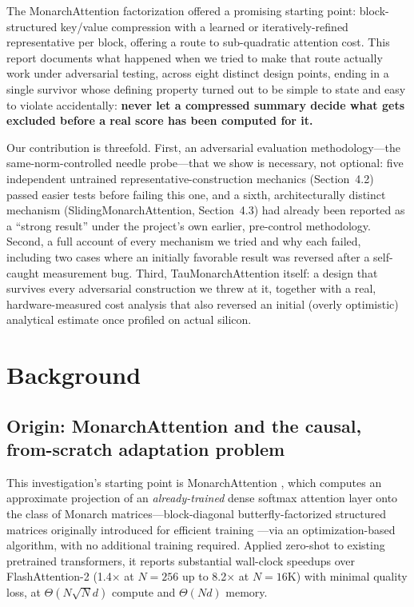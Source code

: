 \documentclass[11pt]{article}
\begin{document}
The MonarchAttention factorization offered a promising starting point: block-structured
key/value compression with a learned or iteratively-refined representative per block,
offering a route to sub-quadratic attention cost. This report documents what happened when
we tried to make that route actually work under adversarial testing, across eight
distinct design points, ending in a single survivor whose defining property turned out to
be simple to state and easy to violate accidentally: \textbf{never let a compressed summary
decide what gets excluded before a real score has been computed for it.}

Our contribution is threefold. First, an adversarial evaluation methodology---the
same-norm-controlled needle probe---that we show is necessary, not optional: five
independent untrained representative-construction mechanics (Section~4.2) passed
easier tests before failing this one, and a sixth, architecturally distinct mechanism
(SlidingMonarchAttention, Section~4.3) had already been reported as a ``strong result''
under the project's own earlier, pre-control methodology. Second, a full account of every
mechanism we tried and why each failed, including two cases where an initially favorable
result was reversed after a self-caught measurement bug. Third, TauMonarchAttention
itself: a design that survives every adversarial construction we threw at it, together
with a real, hardware-measured cost analysis that also reversed an initial (overly
optimistic) analytical estimate once profiled on actual silicon.

\section{Background}

\subsection{Origin: MonarchAttention and the causal, from-scratch adaptation problem}

This investigation's starting point is MonarchAttention \cite{monarchattn}, which computes
an approximate projection of an \emph{already-trained} dense softmax attention layer onto
the class of Monarch matrices---block-diagonal butterfly-factorized structured matrices
originally introduced for efficient training \cite{monarch}---via an optimization-based
algorithm, with no additional training required. Applied zero-shot to existing pretrained
transformers, it reports substantial wall-clock speedups over FlashAttention-2 (1.4$\times$
at $N{=}256$ up to 8.2$\times$ at $N{=}16$K) with minimal quality loss, at
$\Theta(N\sqrt{N}d)$ compute and $\Theta(Nd)$ memory.
\end{document}
